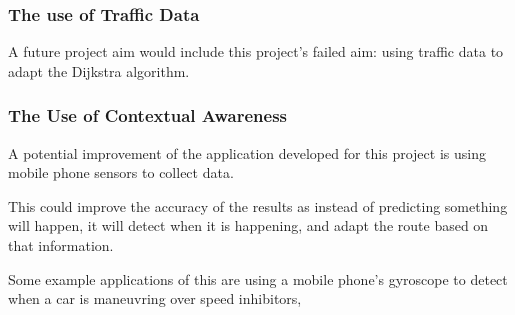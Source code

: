 \documentclass[12pt,a4paper]{article}
\begin{document}
\subsubsection{The use of Traffic Data}
A future project aim would include this project's failed aim: using traffic data to adapt the Dijkstra algorithm.   

\subsubsection{The Use of Contextual Awareness}
A potential improvement of the application developed for this project is using mobile phone sensors to collect data. 

This could improve the accuracy of the results as instead of predicting something will happen, it will detect when it is happening, and adapt the route based on that information.

Some example applications of this are using a mobile phone's gyroscope to detect when a car is maneuvring over speed inhibitors, 








\newpage



\end{document}
